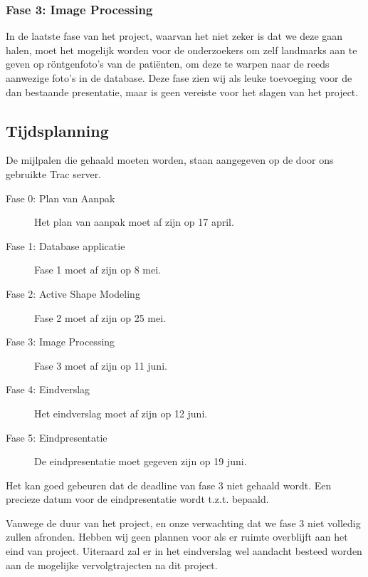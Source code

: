 \subsubsection{Fase 3: Image Processing}
In de laatste fase van het project, waarvan het niet zeker is dat we deze gaan halen, moet het mogelijk worden voor de onderzoekers om zelf landmarks aan te geven op r\"ontgenfoto's van de pati\"enten, om deze te warpen naar de reeds aanwezige foto's in de database. Deze fase zien wij als leuke toevoeging voor de dan bestaande presentatie, maar is geen vereiste voor het slagen van het project.

\subsection{Tijdsplanning}

De mijlpalen die gehaald moeten worden, staan aangegeven op de door ons gebruikte Trac server.
\begin{description}
	\item[Fase 0: Plan van Aanpak] Het plan van aanpak moet af zijn op 17 april.
	\item[Fase 1: Database applicatie] Fase 1 moet af zijn op 8 mei.
	\item[Fase 2: Active Shape Modeling] Fase 2 moet af zijn op 25 mei.
	\item[Fase 3: Image Processing] Fase 3 moet af zijn op 11 juni.
	\item[Fase 4: Eindverslag] Het eindverslag moet af zijn op 12 juni.
	\item[Fase 5: Eindpresentatie] De eindpresentatie moet gegeven zijn op 19 juni.
\end{description}
Het kan goed gebeuren dat de deadline van fase 3 niet gehaald wordt.
Een precieze datum voor de eindpresentatie wordt t.z.t. bepaald.

Vanwege de duur van het project, en onze verwachting dat we fase 3 niet volledig zullen afronden. Hebben wij geen plannen voor als er ruimte overblijft aan het eind van project. Uiteraard zal er in het eindverslag wel aandacht besteed worden aan de mogelijke vervolgtrajecten na dit project.
